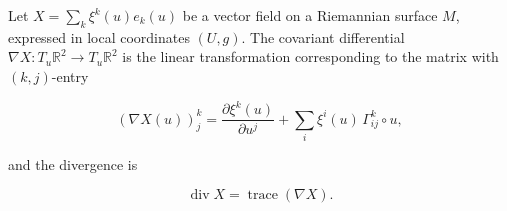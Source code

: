 Let $X = \sum_k \xi^k(u) e_k(u)$ be a vector field on a Riemannian surface $M$, expressed in local coordinates $(U, g)$. The covariant differential $\nabla X: T_u \mathbb{R}^2 \rightarrow T_u \mathbb{R}^2$ is the linear transformation corresponding to the matrix with $(k, j)$-entry

$$(\nabla X(u))_{j}^{k} = \frac{\partial \xi^k(u)}{\partial u^j} + \sum_i \xi^i(u) \, \Gamma_{ij}^k \circ u,$$

and the divergence is

$$\operatorname{div} X = \operatorname{trace}(\nabla X).$$
